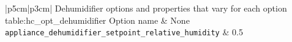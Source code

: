 \begin{customLongTable}{ |p{5cm}|p{3cm}| }
{Dehumidifier options and properties that vary for each option} {table:hc_opt_dehumidifier}
{Option name & None}
\endhead
\hline
\texttt{appliance\_dehumidifier\_setpoint\_relative\_humidity} & 0.5 \\
\end{customLongTable}
